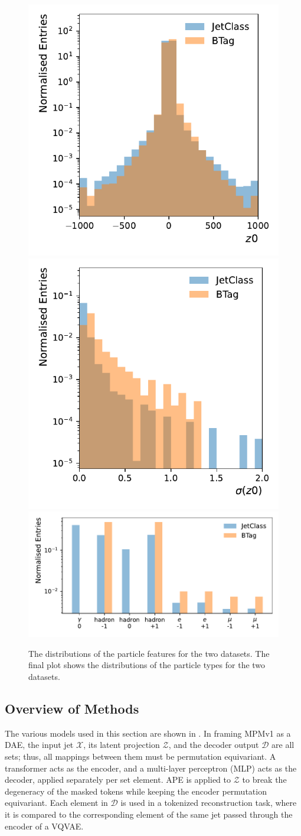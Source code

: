 \begin{figure}[h]
    \includegraphics[width=0.32\linewidth]{Figures/foundation_models/mpm2/data/dzval.pdf}
    \includegraphics[width=0.32\linewidth]{Figures/foundation_models/mpm2/data/dzerr.pdf}
    \includegraphics[width=0.64\linewidth]{Figures/foundation_models/mpm2/data/csts_id.pdf}
    \caption{The distributions of the particle features for the two datasets. The final plot shows the distributions of the particle types \xid for the two datasets.}
    \label{fig:mpm2_features}
\end{figure}

\subsection{Overview of Methods}

The various models used in this section are shown in .
In framing MPMv1 as a DAE, the input jet $\mathcal{X}$, its latent projection $\mathcal{Z}$, and the decoder output $\mathcal{D}$ are all sets; thus, all mappings between them must be permutation equivariant.
A transformer acts as the encoder, and a multi-layer perceptron (MLP) acts as the decoder, applied separately per set element.
APE is applied to $\mathcal{Z}$ to break the degeneracy of the masked tokens while keeping the encoder permutation equivariant.
Each element in $\mathcal{D}$ is used in a tokenized reconstruction task, where it is compared to the corresponding element of the same jet passed through the encoder of a VQVAE.

